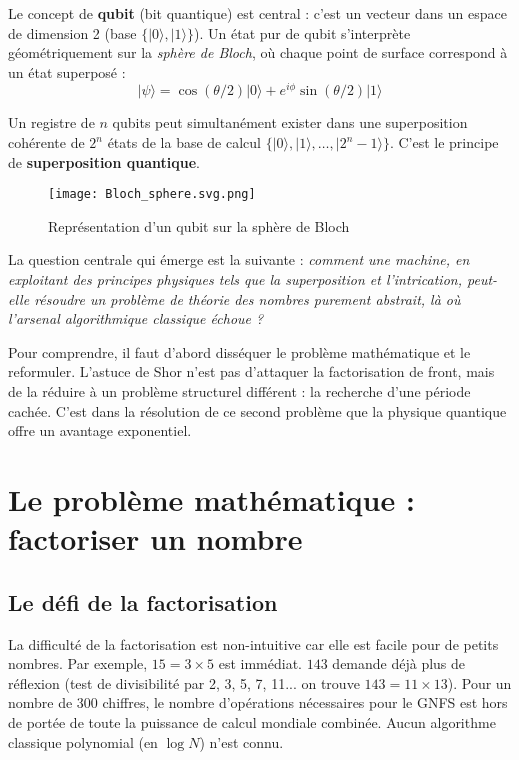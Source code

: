 \documentclass[11pt,a4paper]{article}
\begin{document}
\begin{tcolorbox}[colback=blue!5!white,colframe=blue!75!black,title=Le qubit : fondement du calcul quantique]
Le concept de \textbf{qubit} (bit quantique) est central : c'est un vecteur dans un espace de dimension 2 (base $\{|0\rangle,|1\rangle\}$). Un état pur de qubit s'interprète géométriquement sur la \textit{sphère de Bloch}, où chaque point de surface correspond à un état superposé :
\[|\psi\rangle = \cos(\theta/2)|0\rangle + e^{i\phi}\sin(\theta/2)|1\rangle\]

Un registre de $n$ qubits peut simultanément exister dans une superposition cohérente de $2^n$ états de la base de calcul $\{|0\rangle, |1\rangle, \ldots, |2^n - 1\rangle\}$. C'est le principe de \textbf{superposition quantique}.
\end{tcolorbox}

\begin{figure}[h]
    \centering
    \texttt{[image: Bloch\_sphere.svg.png]}
    \caption{Représentation d'un qubit sur la sphère de Bloch}
\end{figure}
La question centrale qui émerge est la suivante : \textit{comment une machine, en exploitant des principes physiques tels que la superposition et l'intrication, peut-elle résoudre un problème de théorie des nombres purement abstrait, là où l'arsenal algorithmique classique échoue ?}

Pour comprendre, il faut d'abord disséquer le problème mathématique et le reformuler. L'astuce de Shor n'est pas d'attaquer la factorisation de front, mais de la réduire à un problème structurel différent : la recherche d'une période cachée. C'est dans la résolution de ce second problème que la physique quantique offre un avantage exponentiel.

\section{Le problème mathématique : factoriser un nombre}

\subsection{Le défi de la factorisation}

La difficulté de la factorisation est non-intuitive car elle est facile pour de petits nombres. Par exemple, $15 = 3 \times 5$ est immédiat. $143$ demande déjà plus de réflexion (test de divisibilité par 2, 3, 5, 7, 11... on trouve $143 = 11 \times 13$). Pour un nombre de 300 chiffres, le nombre d'opérations nécessaires pour le GNFS est hors de portée de toute la puissance de calcul mondiale combinée. Aucun algorithme classique polynomial (en $\log N$) n'est connu.
\end{document}
